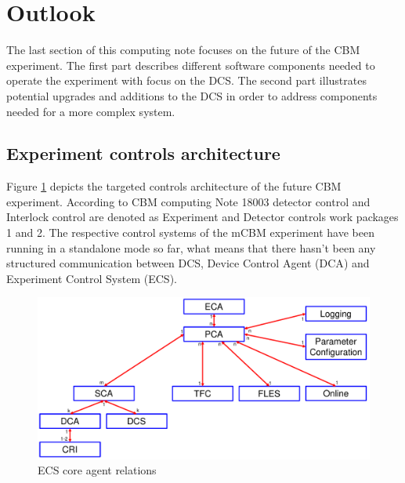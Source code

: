 \newpage
\section{Outlook}
The last section of this computing note focuses on the future of the CBM experiment. The first part describes different software components needed to operate the experiment with focus on the \gls{DCS}. The second part illustrates potential upgrades and additions to the DCS in order to address components needed for a more complex system.
\subsection{Experiment controls architecture}
Figure \ref{fig_sim} depicts the targeted controls architecture of the future CBM experiment. According to CBM computing Note 18003 \cite{CBM_definitions} detector control and Interlock control are denoted as Experiment and Detector controls work packages 1 and 2. The respective control systems of the mCBM experiment have been running in a standalone mode so far, what means that there hasn't been any structured communication between DCS, Device Control Agent (\gls{DCA}) and Experiment Control System (\gls{ECS}).

\begin{figure}[h!]
\centering
\includegraphics[width=0.8\columnwidth]{Chapter3/DCS/images/AgentsRelations_V2.pdf}
\caption{ECS core agent relations}
\label{fig_sim}
\end{figure}

